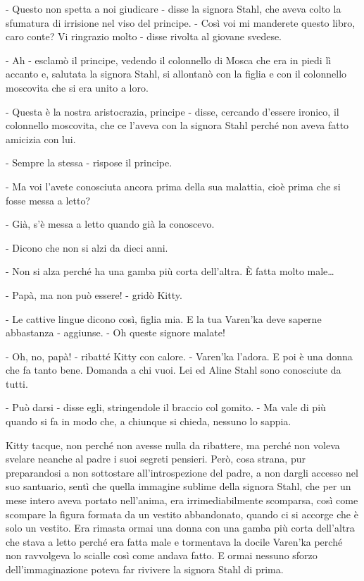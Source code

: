 - Questo non spetta a noi giudicare - disse la signora Stahl, che aveva colto la sfumatura di irrisione nel viso del principe. - Così voi mi manderete questo libro, caro conte? Vi ringrazio molto - disse rivolta al giovane svedese. 

- Ah - esclamò il principe, vedendo il colonnello di Mosca che era in piedi lì accanto e, salutata la signora Stahl, si allontanò con la figlia e con il colonnello moscovita che si era unito a loro. 

- Questa è la nostra aristocrazia, principe - disse, cercando d'essere ironico, il colonnello moscovita, che ce l'aveva con la signora Stahl perché non aveva fatto amicizia con lui. 

- Sempre la stessa - rispose il principe. 

- Ma voi l'avete conosciuta ancora prima della sua malattia, cioè prima che si fosse messa a letto? 

- Già, s'è messa a letto quando già la conoscevo. 

- Dicono che non si alzi da dieci anni. 

- Non si alza perché ha una gamba più corta dell'altra. È fatta molto male\ldots{} 

- Papà, ma non può essere! - gridò Kitty. 

- Le cattive lingue dicono così, figlia mia. E la tua Varen'ka deve saperne abbastanza - aggiunse. - Oh queste signore malate! 

- Oh, no, papà! - ribatté Kitty con calore. - Varen'ka l'adora. E poi è una donna che fa tanto bene. Domanda a chi vuoi. Lei ed Aline Stahl sono conosciute da tutti. 

- Può darsi - disse egli, stringendole il braccio col gomito. - Ma vale di più quando si fa in modo che, a chiunque si chieda, nessuno lo sappia. 

Kitty tacque, non perché non avesse nulla da ribattere, ma perché non voleva svelare neanche al padre i suoi segreti pensieri. Però, cosa strana, pur preparandosi a non sottostare all'introspezione del padre, a non dargli accesso nel suo santuario, sentì che quella immagine sublime della signora Stahl, che per un mese intero aveva portato nell'anima, era irrimediabilmente scomparsa, così come scompare la figura formata da un vestito abbandonato, quando ci si accorge che è solo un vestito. Era rimasta ormai una donna con una gamba più corta dell'altra che stava a letto perché era fatta male e tormentava la docile Varen'ka perché non ravvolgeva lo scialle così come andava fatto. E ormai nessuno sforzo dell'immaginazione poteva far rivivere la signora Stahl di prima. 


